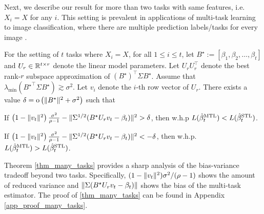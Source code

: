 
Next, we describe our result for more than two tasks with same features, i.e. $X_i = X$ for any $i$.
This setting is prevalent in applications of multi-task learning to image classification, where there are multiple prediction labels/tasks for every image \cite{chexnet17,EA20}.
\begin{theorem}\label{thm_many_tasks}
	For the setting of $t$ tasks where $X_i = X$, for all $1\le i\le t$,
	let $B^\star := [{\beta}_1,{\beta}_2,\dots,{\beta}_{t}]$ and $U_r\in\mathbb{R}^{t\times r}$ denote the linear model parameters.
	Let $U_r U_r^{\top}$ denote the best rank-$r$ subspace approximation of $(B^{\star})^\top\Sigma B^{\star}$.
	Assume that $\lambda_{\min}({B^{\star}}^\top\Sigma B^{\star})\gtrsim \sigma^2$.
	Let $v_i$ denote the $i$-th row vector of $U_r$.
	There exists a value $\delta = \operatorname{o} \left( \|B^\star\|^2 + \sigma^2\right)$ such that
	\squishlist
		\item  If	$\left(1 - \|v_t\|^2 \right)\frac{\sigma^2}{\rho - 1} - \|\Sigma^{1/2} (B^{\star} U_r v_t - \beta_t)\|^2 > \delta$, then w.h.p $L(\hat{\beta}_t^{\text{MTL}}) < L(\hat{\beta}_t^{\text{STL}})$.
		\item If $\left(1 - \|v_t\|^2\right)\frac{\sigma^2}{\rho - 1} - \|\Sigma^{1/2}(B^{\star} U_r v_t - \beta_t)\|^2 < -\delta$, then w.h.p. $L(\hat{\beta}_t^{\text{MTL}}) > L(\hat{\beta}_t^{\text{STL}})$.
	\squishend
\end{theorem}
Theorem \ref{thm_many_tasks} provides a sharp analysis of the bias-variance tradeoff beyond two tasks.
Specifically, $(1 - \|v_t\|^2)\sigma^2/(\rho - 1)$ shows the amount of reduced variance and $\|\Sigma (B^{\star} U_r v_t - \beta_t)\|$ shows the bias of the multi-task estimator.
The proof of \ref{thm_many_tasks} can be found in Appendix \ref{app_proof_many_tasks}.



